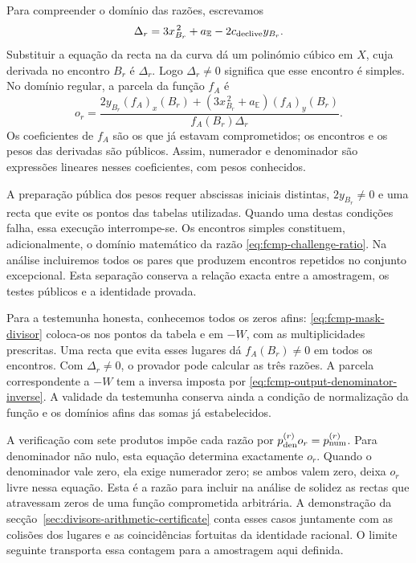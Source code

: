 Para compreender o domínio das razões, escrevamos
\[
 \Delta_r=3x_{B_r}^{\,2}+a_{\mathbb E}
                  -2c_{\rm declive}y_{B_r}.
\]
Substituir a equação da recta na da curva dá um polinómio
cúbico em \(X\), cuja derivada no encontro \(B_r\)
é \(\Delta_r\). Logo \(\Delta_r\ne0\) significa
que esse encontro é simples. No domínio regular, a parcela
da função \(f_A\) é
\begin{equation}
 o_r=
 \frac{2y_{B_r}(f_A)_x(B_r)
       +(3x_{B_r}^{\,2}+a_{\mathbb E})(f_A)_y(B_r)}
      {f_A(B_r)\Delta_r}.
 \label{eq:fcmp-challenge-ratio}
\end{equation}
Os coeficientes de \(f_A\) são os que já estavam
comprometidos; os encontros e os pesos das derivadas são
públicos. Assim, numerador e denominador são expressões
lineares nesses coeficientes, com pesos conhecidos.

A preparação pública dos pesos requer abscissas iniciais
distintas, \(2y_{B_r}\ne0\) e uma recta que evite os
pontos das tabelas utilizadas. Quando uma destas condições
falha, essa execução interrompe-se. Os encontros simples
constituem, adicionalmente, o domínio matemático da razão
\eqref{eq:fcmp-challenge-ratio}. Na análise incluiremos
todos os pares que produzem encontros repetidos no conjunto
excepcional. Esta separação conserva a relação exacta entre
a amostragem, os testes públicos e a identidade provada.

Para a testemunha honesta, conhecemos todos os zeros afins:
\eqref{eq:fcmp-mask-divisor} coloca-os nos pontos da tabela
e em \(-W\), com as multiplicidades prescritas. Uma recta
que evita esses lugares dá \(f_A(B_r)\ne0\) em todos
os encontros. Com \(\Delta_r\ne0\), o provador pode
calcular as três razões. A parcela correspondente a
\(-W\) tem a inversa imposta por
\eqref{eq:fcmp-output-denominator-inverse}. A validade da
testemunha conserva ainda a condição de normalização da
função e os domínios afins das somas já estabelecidos.

A verificação com sete produtos impõe cada razão por
\(p_{\rm den}^{(r)}o_r=p_{\rm num}^{(r)}\).
Para denominador não nulo, esta equação determina
exactamente \(o_r\). Quando o denominador vale zero,
ela exige numerador zero; se ambos valem zero, deixa
\(o_r\) livre nessa equação. Esta é a razão para incluir
na análise de solidez as rectas que atravessam zeros de
uma função comprometida arbitrária. A demonstração da
secção~\ref{sec:divisors-arithmetic-certificate} conta
esses casos juntamente com as colisões dos lugares e as
coincidências fortuitas da identidade racional. O limite
seguinte transporta essa contagem para a amostragem aqui
definida.

